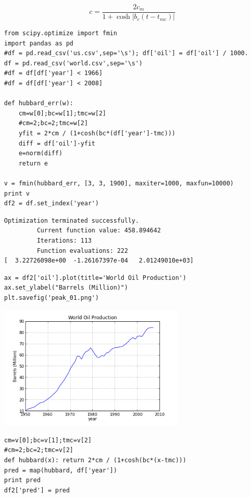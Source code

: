 \documentclass[12pt,fleqn]{article}\usepackage{../common}
\begin{document}
$$ 
c = \frac{ 2c_m}{1 + \cosh |b_c(t-t_{mc})|   }
$$


\begin{verbatim}
from scipy.optimize import fmin
import pandas as pd
#df = pd.read_csv('us.csv',sep='\s'); df['oil'] = df['oil'] / 1000.
df = pd.read_csv('world.csv',sep='\s')
#df = df[df['year'] < 1966]
#df = df[df['year'] < 2008]

def hubbard_err(w):
    cm=w[0];bc=w[1];tmc=w[2]
    #cm=2;bc=2;tmc=w[2]
    yfit = 2*cm / (1+cosh(bc*(df['year']-tmc)))
    diff = df['oil']-yfit
    e=norm(diff)
    return e

v = fmin(hubbard_err, [3, 3, 1900], maxiter=1000, maxfun=10000)
print v
df2 = df.set_index('year')
\end{verbatim}

\begin{verbatim}
Optimization terminated successfully.
         Current function value: 458.894642
         Iterations: 113
         Function evaluations: 222
[  3.22726098e+00  -1.26167397e-04   2.01249010e+03]
\end{verbatim}

\begin{verbatim}
ax = df2['oil'].plot(title='World Oil Production')
ax.set_ylabel("Barrels (Million)")
plt.savefig('peak_01.png')
\end{verbatim}


\includegraphics[height=6cm]{peak_01.png}

\begin{verbatim}
cm=v[0];bc=v[1];tmc=v[2]
#cm=2;bc=2;tmc=v[2]
def hubbard(x): return 2*cm / (1+cosh(bc*(x-tmc)))
pred = map(hubbard, df['year'])
print pred
df2['pred'] = pred
\end{verbatim}
\end{document}
